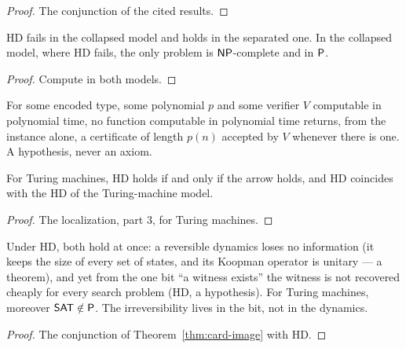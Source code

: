 \begin{proof}
  \leanok
  The conjunction of the cited results.
\end{proof}

\begin{theorem}
  \label{thm:hd-independent}
  \leanok
  HD fails in the collapsed model and holds in the separated one. In the collapsed model, where HD
  fails, the only problem is $\mathsf{NP}$-complete and in $\mathsf{P}$.
  \own{}
\end{theorem}

\begin{proof}
  \leanok
  Compute in both models.
\end{proof}

\begin{definition}
  \label{def:hd-tm}
  \leanok
  For some encoded type, some polynomial $p$ and some verifier $V$ computable in polynomial time, no
  function computable in polynomial time returns, from the instance alone, a certificate of length
  $p(n)$ accepted by $V$ whenever there is one. A hypothesis, never an axiom.
  \own{}
\end{definition}

\begin{theorem}
  \label{thm:hd-iff-arrow-tm}
  \leanok
  For Turing machines, HD holds if and only if the arrow holds, and HD coincides with the HD of the
  Turing-machine model.
  \own{}
\end{theorem}

\begin{proof}
  \leanok
  The localization, part 3, for Turing machines.
\end{proof}

\begin{theorem}
  \label{thm:irreversibility-without-loss}
  \leanok
  Under HD, both hold at once: a reversible dynamics loses no information (it keeps the size of
  every set of states, and its Koopman operator is unitary --- a theorem), and yet from the one bit
  ``a witness exists'' the witness is not recovered cheaply for every search problem (HD, a
  hypothesis). For Turing machines, moreover $\mathsf{SAT} \notin \mathsf{P}$. The irreversibility lives in the
  bit, not in the dynamics.
  \own{}
\end{theorem}

\begin{proof}
  \leanok
  The conjunction of Theorem~\ref{thm:card-image} with HD.
\end{proof}
